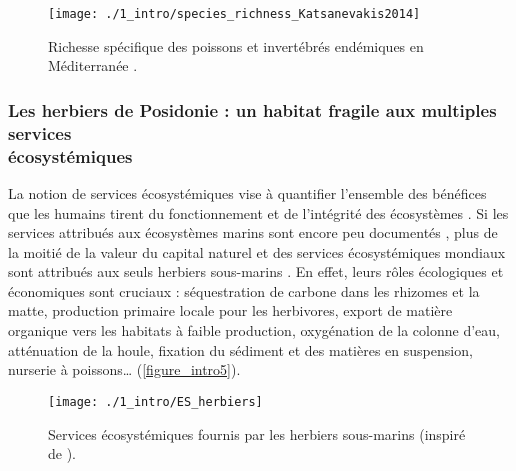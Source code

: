 \begin{figure}[H]
	\begin{center}
	\texttt{[image: ./1\_intro/species\_richness\_Katsanevakis2014]}
		\caption[Richesse spécifique des poissons et invertébrés endémiques en Méditerranée]{Richesse spécifique des poissons et invertébrés endémiques en Méditerranée \citep{katsanevakis_invading_2014}.}
	\label{figure_intro4}
\end{center}
\end{figure}

\subsubsection{Les herbiers de Posidonie : un habitat fragile aux multiples services \\ écosystémiques}\label{intro.1.3.1}

La notion de services écosystémiques vise à quantifier l’ensemble des bénéfices que les humains tirent du fonctionnement et de l’intégrité des écosystèmes \citep{de_groot_global_2012}. Si les services attribués aux écosystèmes marins sont encore peu documentés \citep{townsend_challenge_2018}, plus de la moitié de la valeur du capital naturel et des services écosystémiques mondiaux sont attribués aux seuls herbiers sous-marins \citep{millenium_ecosystem_assessment_ecosystem_2005, ipbes_global_2019}. En effet, leurs rôles écologiques et économiques sont cruciaux : séquestration de carbone dans les rhizomes et la matte, production primaire locale pour les herbivores, export de matière organique vers les habitats à faible production, oxygénation de la colonne d’eau, atténuation de la houle, fixation du sédiment et des matières en suspension, nurserie à poissons… (\autoref{figure_intro5}).

\begin{figure}[H]
	\begin{center}
	\texttt{[image: ./1\_intro/ES\_herbiers]}
		\caption[Services écosystémiques fournis par les herbiers sous-marins]{Services écosystémiques fournis par les herbiers sous-marins (inspiré de \citet{boudouresque_protection_2012}).}
	\label{figure_intro5}
\end{center}
\end{figure}

